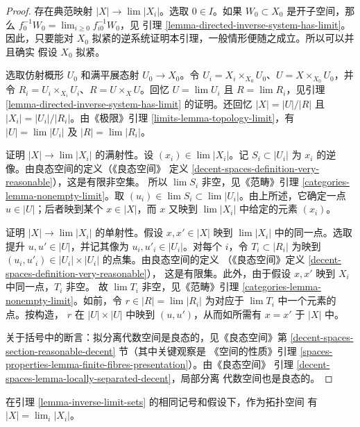\begin{proof}
存在典范映射 $|X|\to\lim|X_i|$。选取 $0\in I$。如果
$W_0\subset X_0$ 是开子空间，那么
$f_0^{-1}W_0 = \lim_{i \geq 0} f_{i0}^{-1}W_0$，见
引理 \ref{lemma-directed-inverse-system-has-limit}。因此，只要能对
$X_0$ 拟紧的逆系统证明本引理，一般情形便随之成立。所以可以并且确实
假设 $X_0$ 拟紧。

\medskip\noindent
选取仿射概形 $U_0$ 和满平展态射 $U_0\to X_0$。令
$U_i=X_i\times_{X_0}U_0$、$U=X\times_{X_0}U_0$，并令
$R_i=U_i\times_{X_i}U_i$、$R=U\times_XU$。回忆
$U=\lim U_i$ 且 $R=\lim R_i$，见引理
\ref{lemma-directed-inverse-system-has-limit} 的证明。还回忆
$|X|=|U|/|R|$ 且 $|X_i|=|U_i|/|R_i|$。由《极限》引理
\ref{limits-lemma-topology-limit}，有 $|U|=\lim|U_i|$ 及
$|R|=\lim|R_i|$。

\medskip\noindent
证明 $|X|\to\lim|X_i|$ 的满射性。设 $(x_i)\in\lim|X_i|$。记
$S_i\subset|U_i|$ 为 $x_i$ 的逆像。由良态空间的定义（《良态空间》
定义 \ref{decent-spaces-definition-very-reasonable}），这是有限非空集。
所以 $\lim S_i$ 非空，见《范畴》引理
\ref{categories-lemma-nonempty-limit}。取
$(u_i)\in\lim S_i\subset\lim|U_i|$。由上所述，它确定一点
$u\in|U|$；后者映到某个 $x\in|X|$，而 $x$ 又映到 $\lim|X_i|$
中给定的元素 $(x_i)$。

\medskip\noindent
证明 $|X|\to\lim|X_i|$ 的单射性。假设 $x,x'\in|X|$ 映到
$\lim|X_i|$ 中的同一点。选取提升 $u,u'\in|U|$，并记其像为
$u_i,u'_i\in|U_i|$。对每个 $i$，令 $T_i\subset|R_i|$ 为映到
$(u_i,u'_i)\in|U_i|\times|U_i|$ 的点集。由良态空间的定义
（《良态空间》定义 \ref{decent-spaces-definition-very-reasonable}），
这是有限集。此外，由于假设 $x,x'$ 映到 $X_i$ 中同一点，$T_i$ 非空。
故 $\lim T_i$ 非空，见《范畴》引理
\ref{categories-lemma-nonempty-limit}。如前，令
$r\in|R|=\lim|R_i|$ 为对应于 $\lim T_i$ 中一个元素的点。按构造，
$r$ 在 $|U|\times|U|$ 中映到 $(u,u')$，从而如所需有
$x=x'$ 于 $|X|$ 中。

\medskip\noindent
关于括号中的断言：拟分离代数空间是良态的，见《良态空间》第
\ref{decent-spaces-section-reasonable-decent} 节（其中关键观察是
《空间的性质》引理
\ref{spaces-properties-lemma-finite-fibres-presentation}）。由《良态空间》
引理 \ref{decent-spaces-lemma-locally-separated-decent}，局部分离
代数空间也是良态的。
\end{proof}

\begin{lemma}
\label{lemma-topology-limit}
在引理 \ref{lemma-inverse-limit-sets} 的相同记号和假设下，作为拓扑空间
有 $|X|=\lim_i|X_i|$。
\end{lemma}

